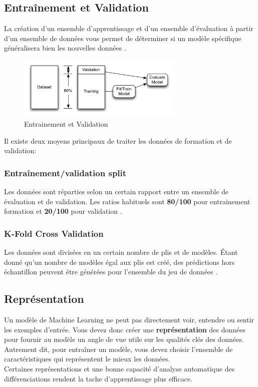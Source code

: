 \documentclass[12pt]{report}
\begin{document}
\subsection{Entraînement et Validation}
La création d'un ensemble d'apprentissage et d'un ensemble d'évaluation à partir d'un ensemble de données vous permet de déterminer si un modèle spécifique généralisera bien les nouvelles données \cite{ref15} .\\
\begin{figure}[h]
\begin{center}
\includegraphics[width=300]{evalu.png}
\caption{Entrainement et Validation}

\end{center}

\end{figure}


 Il existe deux moyens principaux de traiter les données de formation et de validation:
\subsubsection{Entraînement/validation split}
Les données sont réparties selon un certain rapport entre un ensemble de évaluation et de validation. Les ratios habituels sont \textbf{80/100}  pour entrainement formation et \textbf{20/100}  pour validation  \cite{ref16}.

\subsubsection{K-Fold Cross Validation}
Les données sont divisées en un certain nombre de plis et de modèles. Étant donné qu'un nombre de modèles égal aux plis est créé, des prédictions hors échantillon peuvent être générées pour l'ensemble du jeu de données  \cite{ref17}.

\subsection{Représentation}
Un modèle de Machine Learning ne peut pas directement voir, entendre ou sentir les exemples d'entrée. Vous devez donc créer
une\textbf{ représentation }des données pour fournir au modèle un angle de vue utile sur les qualités clés des données. Autrement dit, pour entraîner un modèle, vous devez choisir l'ensemble de caractéristiques qui représentent le mieux les données.\\
Certaines représentations et une bonne capacité d’analyse automatique des différenciations rendent la tache d'apprentissage plus efficace.
\end{document}
